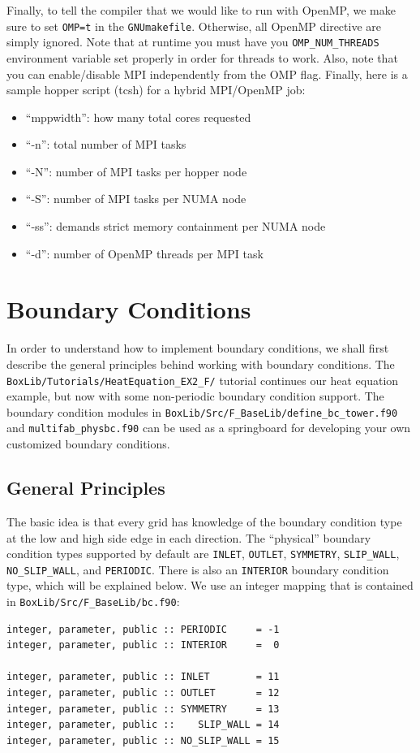 Finally, to tell the compiler that we would like to run with OpenMP, we make sure to
set {\tt OMP=t} in the {\tt GNUmakefile}.  Otherwise, all OpenMP directive are
simply ignored.  Note that at runtime you must have you 
{\tt OMP\_NUM\_THREADS} environment variable set properly in order for threads to work.
Also, note that you can enable/disable MPI independently from the OMP flag.  Finally,
here is a sample hopper script (tcsh) for a hybrid MPI/OpenMP job:

\begin{itemize}
\item ``mppwidth'': how many total cores requested
\item ``-n'': total number of MPI tasks
\item ``-N'': number of MPI tasks per hopper node
\item ``-S'': number of MPI tasks per NUMA node
\item ``-ss'': demands strict memory containment per NUMA node
\item ``-d'': number of OpenMP threads per MPI task
\end{itemize}
\section{Boundary Conditions}\label{Sec:Boundary Conditions}
In order to understand how to implement boundary conditions, we shall 
first describe the general principles behind working with boundary conditions.
The {\tt BoxLib/Tutorials/HeatEquation\_EX2\_F/} tutorial continues our heat
equation example, but now with some non-periodic boundary condition support.  The boundary
condition modules in {\tt BoxLib/Src/F\_BaseLib/define\_bc\_tower.f90} and {\tt multifab\_physbc.f90} 
can be used as a springboard for developing your own customized boundary conditions.

\subsection{General Principles}
The basic idea is that every grid has knowledge of the
boundary condition type at the low and high side edge in each direction.
The ``physical'' boundary condition types supported by default are {\tt INLET}, {\tt OUTLET},
{\tt SYMMETRY}, {\tt SLIP\_WALL}, {\tt NO\_SLIP\_WALL}, and {\tt PERIODIC}.
There is also an {\tt INTERIOR} boundary condition type, which 
will be explained below.  We use an integer mapping that is 
contained in {\tt BoxLib/Src/F\_BaseLib/bc.f90}:
\begin{lstlisting}[backgroundcolor=\color{light-green}]
integer, parameter, public :: PERIODIC     = -1
integer, parameter, public :: INTERIOR     =  0

integer, parameter, public :: INLET        = 11
integer, parameter, public :: OUTLET       = 12
integer, parameter, public :: SYMMETRY     = 13
integer, parameter, public ::    SLIP_WALL = 14
integer, parameter, public :: NO_SLIP_WALL = 15
\end{lstlisting}

